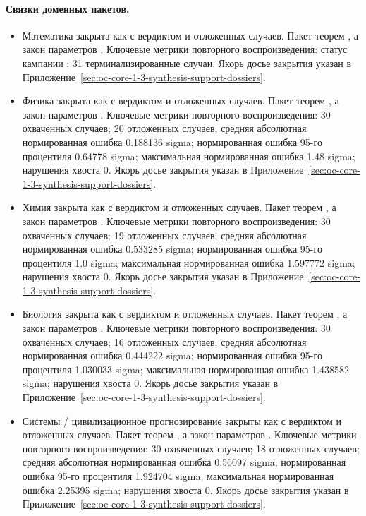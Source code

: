 \paragraph{Связки доменных пакетов.}
\begin{itemize}[leftmargin=1.6em,nosep]
\item Математика закрыта как  с вердиктом  и  отложенных случаев. Пакет теорем , а закон параметров . Ключевые метрики повторного воспроизведения: статус кампании ; 31 терминализированные случаи. Якорь досье закрытия указан в Приложение~\ref{sec:oc-core-1-3-synthesis-support-dossiers}.
\item Физика закрыта как  с вердиктом  и  отложенных случаев. Пакет теорем , а закон параметров . Ключевые метрики повторного воспроизведения: 30 охваченных случаев; 20 отложенных случаев; средняя абсолютная нормированная ошибка 0.188136 sigma; нормированная ошибка 95-го процентиля 0.64778 sigma; максимальная нормированная ошибка 1.48 sigma; нарушения хвоста 0. Якорь досье закрытия указан в Приложение~\ref{sec:oc-core-1-3-synthesis-support-dossiers}.
\item Химия закрыта как  с вердиктом  и  отложенных случаев. Пакет теорем , а закон параметров . Ключевые метрики повторного воспроизведения: 30 охваченных случаев; 19 отложенных случаев; средняя абсолютная нормированная ошибка 0.533285 sigma; нормированная ошибка 95-го процентиля 1.0 sigma; максимальная нормированная ошибка 1.597772 sigma; нарушения хвоста 0. Якорь досье закрытия указан в Приложение~\ref{sec:oc-core-1-3-synthesis-support-dossiers}.
\item Биология закрыта как  с вердиктом  и  отложенных случаев. Пакет теорем , а закон параметров . Ключевые метрики повторного воспроизведения: 30 охваченных случаев; 16 отложенных случаев; средняя абсолютная нормированная ошибка 0.444222 sigma; нормированная ошибка 95-го процентиля 1.030033 sigma; максимальная нормированная ошибка 1.438582 sigma; нарушения хвоста 0. Якорь досье закрытия указан в Приложение~\ref{sec:oc-core-1-3-synthesis-support-dossiers}.
\item Системы / цивилизационное прогнозирование закрыты как  с вердиктом  и  отложенных случаев. Пакет теорем , а закон параметров . Ключевые метрики повторного воспроизведения: 30 охваченных случаев; 18 отложенных случаев; средняя абсолютная нормированная ошибка 0.56097 sigma; нормированная ошибка 95-го процентиля 1.924704 sigma; максимальная нормированная ошибка 2.25395 sigma; нарушения хвоста 0. Якорь досье закрытия указан в Приложение~\ref{sec:oc-core-1-3-synthesis-support-dossiers}.

\end{itemize}
